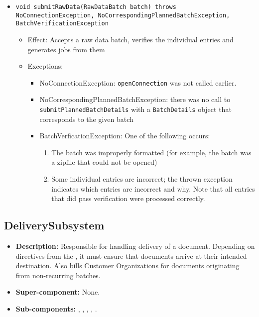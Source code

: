 \begin{itemize}
\begin{itemize}
		\item \texttt{void submitRawData(RawDataBatch batch) throws NoConnectionException, NoCorrespondingPlannedBatchException, BatchVerificationException}
		\begin{itemize}
			\item Effect: Accepts a raw data batch, verifies the individual entries and generates jobs from them
			\item Exceptions:
			\begin{itemize}
				\item NoConnectionException: \texttt{openConnection} was not called earlier.
				\item NoCorrespondingPlannedBatchException: there was no call to \texttt{submitPlannedBatchDetails} with a \texttt{BatchDetails} object that corresponds to the given batch
				\item BatchVerficationException: One of the following occurs:
				\begin{enumerate}
					\item The batch was improperly formatted (for example, the batch was a zipfile that could not be opened)
					\item Some individual entries are incorrect; the thrown exception indicates which entries are incorrect and why. Note that all entries that did pass verification were processed correctly.
				\end{enumerate} 
			\end{itemize}
		\end{itemize}
	\end{itemize}
\end{itemize}

\subsection{DeliverySubsystem}
\begin{itemize}
    \item \textbf{Description:} Responsible for handling delivery of a document. Depending on directives from the , it must ensure that documents arrive at their intended destination. Also bills Customer Organizations for documents originating from non-recurring batches.
    \item \textbf{Super-component:} None.
    \item \textbf{Sub-components:} , , , , .
\end{itemize}

